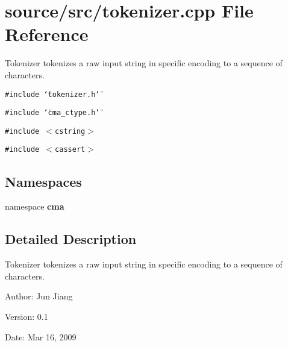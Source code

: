 \section{source/src/tokenizer.cpp File Reference}
\label{tokenizer_8cpp}
Tokenizer tokenizes a raw input string in specific encoding to a sequence of characters. 

{\tt \#include \char`\"{}tokenizer.h\char`\"{}}\par
{\tt \#include \char`\"{}cma\_\-ctype.h\char`\"{}}\par
{\tt \#include $<$cstring$>$}\par
{\tt \#include $<$cassert$>$}\par
\subsection*{Namespaces}
\begin{CompactItemize}
\item 
namespace \textbf{cma}
\end{CompactItemize}


\subsection{Detailed Description}
Tokenizer tokenizes a raw input string in specific encoding to a sequence of characters. 

\begin{Desc}
\item[Author:]Jun Jiang \end{Desc}
\begin{Desc}
\item[Version:]0.1 \end{Desc}
\begin{Desc}
\item[Date:]Mar 16, 2009 \end{Desc}
